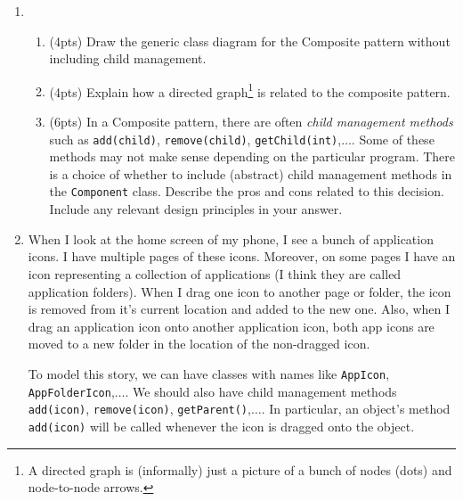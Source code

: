 \documentclass[11pt]{article}
\begin{document}
\begin{enumerate}
\newpage

  \item 

  \begin{enumerate}

    \item (4pts) Draw the generic class diagram for the Composite pattern without including child management. 

    \vfill

    \item (4pts) Explain how a directed graph\footnote{A directed graph is (informally) just a picture of a bunch of nodes (dots) and node-to-node arrows.} is related to the composite pattern. 

    \vfill 

    \item (6pts) In a Composite pattern, there are often \emph{child management methods} such as \texttt{add(child)}, \newline\texttt{remove(child)}, \texttt{getChild(int)},$\ldots$. Some of these methods may not make sense depending on the particular program. There is a choice of whether to include (abstract) child management methods in the \texttt{Component} class. Describe the pros and cons related to this decision. Include any relevant design principles in your answer. 

    \vfill

  \end{enumerate}

\newpage

  \item When I look at the home screen of my phone, I see a bunch of application icons. I have multiple pages of these icons. Moreover, on some pages I have an icon representing a collection of applications (I think they are called application folders). When I drag one icon to another page or folder, the icon is removed from it's current location and added to the new one. Also, when I drag an application icon onto another application icon, both app icons are moved to a new folder in the location of the non-dragged icon.

  To model this story, we can have classes with names like \texttt{AppIcon}, \texttt{AppFolderIcon},$\ldots$. We should also have child management methods \texttt{add(icon)}, \texttt{remove(icon)}, \texttt{getParent()},$\ldots$. In particular, an object's method \texttt{add(icon)} will be called whenever the icon is dragged onto the object.


\end{enumerate}
\end{document}
